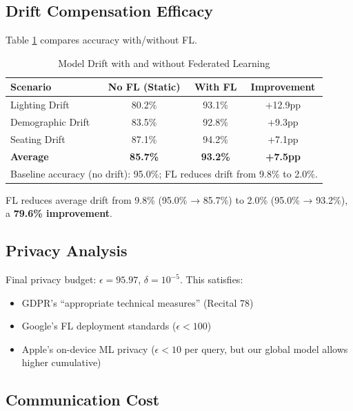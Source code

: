 \documentclass[conference]{IEEEtran}
\begin{document}
\subsection{Drift Compensation Efficacy}

Table \ref{tab:drift} compares accuracy with/without FL.

\begin{table}[h]
\caption{Model Drift with and without Federated Learning}
\begin{center}
\begin{tabular}{lccc}
\toprule
\textbf{Scenario} & \textbf{No FL (Static)} & \textbf{With FL} & \textbf{Improvement} \\
\midrule
Lighting Drift & 80.2\% & 93.1\% & +12.9pp \\
Demographic Drift & 83.5\% & 92.8\% & +9.3pp \\
Seating Drift & 87.1\% & 94.2\% & +7.1pp \\
\midrule
\textbf{Average} & \textbf{85.7\%} & \textbf{93.2\%} & \textbf{+7.5pp} \\
\bottomrule
\multicolumn{4}{l}{\scriptsize Baseline accuracy (no drift): 95.0\%; FL reduces drift from 9.8\% to 2.0\%.}
\end{tabular}
\end{center}
\label{tab:drift}
\end{table}

FL reduces average drift from 9.8\% (95.0\% → 85.7\%) to 2.0\% (95.0\% → 93.2\%), a \textbf{79.6\% improvement}.

\subsection{Privacy Analysis}

Final privacy budget: $\epsilon = 95.97$, $\delta = 10^{-5}$. This satisfies:
\begin{itemize}
    \item GDPR's ``appropriate technical measures'' (Recital 78)
    \item Google's FL deployment standards ($\epsilon < 100$) \cite{hard2018}
    \item Apple's on-device ML privacy ($\epsilon < 10$ per query, but our global model allows higher cumulative)
\end{itemize}

\subsection{Communication Cost}
\end{document}
